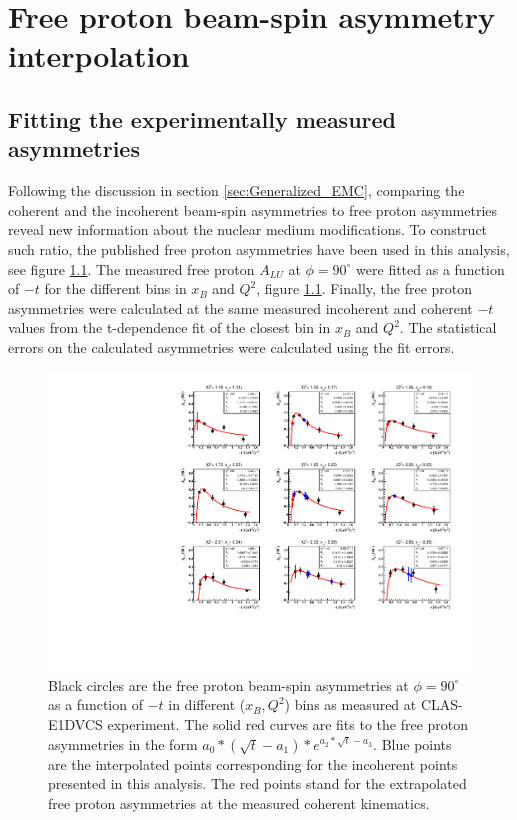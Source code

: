 \chapter{Free proton beam-spin asymmetry interpolation} 
\label{app:free-proton-alu}
\section{Fitting the experimentally measured asymmetries} \label{fit_int} 
Following the discussion in section \ref{sec:Generalized_EMC}, comparing the 
coherent and the incoherent beam-spin asymmetries to free proton asymmetries 
reveal new information about the nuclear medium modifications. To construct 
such ratio, the published free proton asymmetries \cite{FX_BSA} have been used 
in this analysis, see figure \ref{fig:free-proton-alu}. The measured free 
proton $A_{LU}$ at $\phi = 90^{\circ}$ were fitted as a function of $-t$ for 
the different bins in $x_B$ and $Q^2$, figure \ref{fig:free-proton-alu}.  
Finally, the free proton asymmetries were calculated at the same measured 
incoherent and coherent $-t$ values from the t-dependence fit of the closest 
bin in $x_B$ and $Q^2$.  The statistical errors on the calculated asymmetries 
were calculated using the fit errors.\\ 


\begin{figure}[tpb]
\centering
\includegraphics[scale=0.85]{fig_Dec2016/F_ALU-proton-fits.pdf}
\caption{Black circles are the free proton beam-spin asymmetries at $\phi = 90 
   ^{\circ}$ as a function of $-t$ in different ($x_B, Q^2$) bins as measured 
   at CLAS-E1DVCS experiment. The solid red curves are fits to the free proton 
   asymmetries in the form $a_{0}*(\sqrt{t}-a_{1})*e^{a_{2}*\sqrt{t} - a_{3}}$.
   Blue points are the interpolated points corresponding for the incoherent 
points presented in this analysis. The red points stand for the extrapolated 
free proton asymmetries at the measured coherent kinematics.}
\label{fig:free-proton-alu}
\end{figure}



